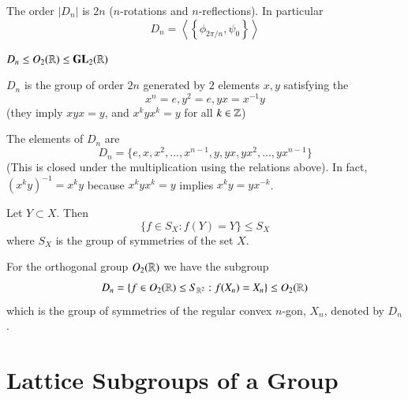 \documentclass[12pt, a4paper, oneside, openright, titlepage]{book}
\begin{document}
\begin{cor}
    The order $|D_n|$ is $2n$ ($n$-rotations and $n$-reflections). In particular \begin{equation}
        D_n = \left\langle \left\{\phi_{2\pi/n},\psi_0\right\}\right\rangle
    \end{equation}
\end{cor}

\begin{rmk}
    $D_n \leq O_2(\mathbb R) \leq \mathbf{GL}_2(\mathbb R)$
\end{rmk}

\begin{defn}
    $D_n$ is the group of order $2n$ generated by $2$ elements $x,y$ satisfying the  \begin{equation}
        x^n = e, y^2 = e, yx = x^{-1}y
    \end{equation}
    (they imply $xyx = y$, and $x^kyx^k = y$ for all $k \in \mathbb Z$)
\end{defn}

\begin{rmk}
    The elements of $D_n$ are \begin{equation}
        D_n = \{e,x,x^2,...,x^{n-1},y,yx,yx^2,...,yx^{n-1}\}
    \end{equation}
    (This is closed under the multiplication using the relations above). In fact, $(x^ky)^{-1} = x^ky$ because $x^kyx^k = y$ implies $x^ky = yx^{-k}$.
\end{rmk}

\begin{rmk}
    Let $Y \subset X$. Then \begin{equation}
        \{f\in S_X:f(Y) = Y\} \leq S_X
    \end{equation}
    where $S_X$ is the group of symmetries of the set $X$.
\end{rmk}


\begin{rmk}
    For the orthogonal group $O_2(\mathbb R)$ we have the subgroup \begin{equation}
        D_n = \{f\in O_2(\mathbb R) \leq S_{\mathbb R^2}:f(X_n) = X_n\} \leq O_2(\mathbb R)
    \end{equation}
    which is the group of symmetries of the regular convex $n$-gon, $X_n$, denoted by $D_n$.
\end{rmk}

\section{\textsection Lattice Subgroups of a Group}
\end{document}
